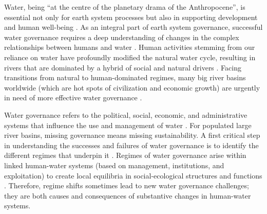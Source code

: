\label{Intro.}
Water, being ``at the centre of the planetary drama of the Anthropocene'', is essential not only for earth system processes but also in supporting development and human well-being
\cite{gleeson2020a,gleeson2020b}.
As an integral part of earth system governance, successful water governance requires a deep understanding of changes in the complex relationships between humans and water
\cite{ahlstrom2021,biermann2012,steffen2020}.
Human activities stemming from our reliance on water have profoundly modified the natural water cycle, resulting in rivers that are dominated by a hybrid of social and natural drivers
\cite{sivapalan2012,qin2014,abbott2019}.
Facing transitions from natural to human-dominated regimes, many big river basins worldwide (which are hot spots of civilization and economic growth) are urgently in need of more effective water governance
\cite{best2019,dibaldassarre2019}.

Water governance refers to the political, social, economic, and administrative systems that influence the use and management of water \cite{oecd2018, wang2017}.
For populated large river basins, missing governance means missing sustainability.
A first critical step in understanding the successes and failures of water governance is to identify the different regimes that underpin it \cite{kjellen2015, grafton2013}.
Regimes of water governance arise within linked human-water systems (based on management, institutions, and exploitation) to create local equilibria in social-ecological structures and functions
\cite{falkenmark2021,bressers2013,loch2020}.
Therefore, regime shifts sometimes lead to new water governance challenges; they are both causes and consequences of substantive changes in human-water systems.

